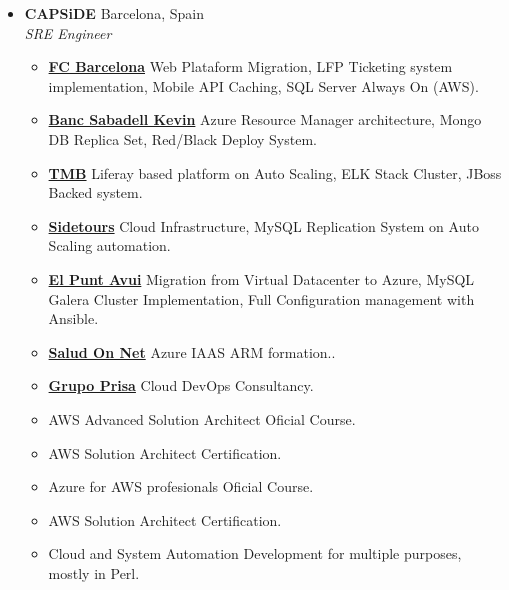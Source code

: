 \documentclass[]{friggeri-cv} %
\renewenvironment{entrylist}{%
  \begin{itemize}[leftmargin=1in]%
}{%
  \end{itemize}
}
\renewcommand{\entry}[4]{%
  \item[#1]
    \textbf{#2}%
    \hfill%
    {\footnotesize\addfontfeature{Color=lightgray} #3}\\%
    #4\vspace{\parsep}%
  }
\begin{document}
\begin{entrylist}
\entry
{2014--2016}
{CAPSiDE}
{Barcelona, Spain}
{\emph{SRE Engineer} 
\begin{itemize}[label=\textbullet]
    \item \href{http://www.fcbarcelona.com/}{\textbf{FC Barcelona}} Web Plataform Migration, LFP Ticketing system implementation, Mobile API Caching, SQL Server Always On (AWS). 
    \item \href{http://kelvinretail.com/}{\textbf{Banc Sabadell Kevin}} Azure Resource Manager architecture, Mongo DB Replica Set, Red/Black Deploy System.
    \item \href{http://www.tmb.cat/}{\textbf{TMB}} Liferay based platform on Auto Scaling, ELK Stack Cluster, JBoss Backed system.
    \item \href{http://www.sidetours.com/}{\textbf{Sidetours}} Cloud Infrastructure, MySQL Replication System on Auto Scaling automation.
    \item \href{http://www.elpuntavui.cat/}{\textbf{El Punt Avui}} Migration from Virtual Datacenter to Azure, MySQL Galera Cluster Implementation, Full Configuration management with Ansible.
    \item \href{https://www.saludonnet.com/}{\textbf{Salud On Net}} Azure IAAS ARM formation..
    \item \href{http://www.prisa.com/}{\textbf{Grupo Prisa}} Cloud DevOps Consultancy.
    \item AWS Advanced Solution Architect Oficial Course.  
    \item AWS Solution Architect Certification. 
    \item Azure for AWS profesionals Oficial Course. 
    \item AWS Solution Architect Certification. 
    \item Cloud and System Automation Development for multiple purposes, mostly in Perl.
\end{itemize}}


\end{entrylist}
\end{document}
